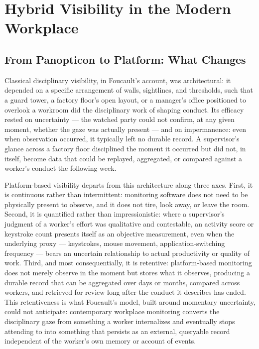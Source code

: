 \documentclass[12pt]{article}
\begin{document}
\section{Hybrid Visibility in the Modern Workplace}

\subsection{From Panopticon to Platform: What Changes}

Classical disciplinary visibility, in Foucault's account, was architectural: it depended on a specific arrangement of walls, sightlines, and thresholds, such that a guard tower, a factory floor's open layout, or a manager's office positioned to overlook a workroom did the disciplinary work of shaping conduct. Its efficacy rested on uncertainty --- the watched party could not confirm, at any given moment, whether the gaze was actually present --- and on impermanence: even when observation occurred, it typically left no durable record. A supervisor's glance across a factory floor disciplined the moment it occurred but did not, in itself, become data that could be replayed, aggregated, or compared against a worker's conduct the following week.

Platform-based visibility departs from this architecture along three axes. First, it is continuous rather than intermittent: monitoring software does not need to be physically present to observe, and it does not tire, look away, or leave the room. Second, it is quantified rather than impressionistic: where a supervisor's judgment of a worker's effort was qualitative and contestable, an activity score or keystroke count presents itself as an objective measurement, even when the underlying proxy --- keystrokes, mouse movement, application-switching frequency --- bears an uncertain relationship to actual productivity or quality of work. Third, and most consequentially, it is retentive: platform-based monitoring does not merely observe in the moment but stores what it observes, producing a durable record that can be aggregated over days or months, compared across workers, and retrieved for review long after the conduct it describes has ended. This retentiveness is what Foucault's model, built around momentary uncertainty, could not anticipate: contemporary workplace monitoring converts the disciplinary gaze from something a worker internalizes and eventually stops attending to into something that persists as an external, queryable record independent of the worker's own memory or account of events.
\end{document}
